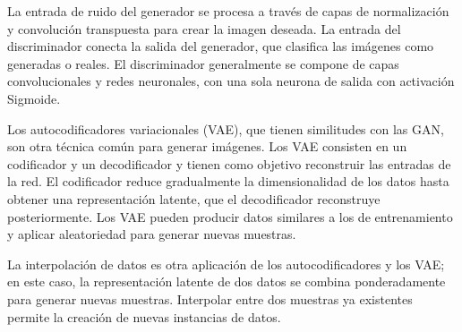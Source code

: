 La entrada de ruido del generador se procesa a través de capas de normalización y convolución transpuesta para crear la imagen deseada. La entrada del discriminador conecta la salida del generador, que clasifica las imágenes como generadas o reales. El discriminador generalmente se compone de capas convolucionales y redes neuronales, con una sola neurona de salida con activación Sigmoide. \parencite{tec_kingma2019variat}

Los autocodificadores variacionales (VAE), que tienen similitudes con las GAN, son otra técnica común para generar imágenes. Los VAE consisten en un codificador y un decodificador y tienen como objetivo reconstruir las entradas de la red. El codificador reduce gradualmente la dimensionalidad de los datos hasta obtener una representación latente, que el decodificador reconstruye posteriormente. Los VAE pueden producir datos similares a los de entrenamiento y aplicar aleatoriedad para generar nuevas muestras. \parencite{tec_kingma2013bayes}

La interpolación de datos es otra aplicación de los autocodificadores y los VAE; en este caso, la representación latente de dos datos se combina ponderadamente para generar nuevas muestras. Interpolar entre dos muestras ya existentes permite la creación de nuevas instancias de datos. \parencite{tec_kingma2013bayes}

\newpage